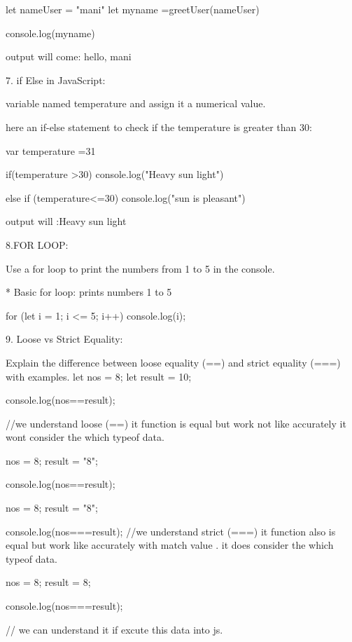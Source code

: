  let nameUser = "mani"
 let myname =greetUser(nameUser)
 
 console.log(myname)

      output will come: hello, mani

7. if Else in JavaScript:

 variable named temperature and assign it a numerical value.

here an if-else statement to check if the temperature is greater than 30:


var temperature =31

if(temperature >30)
{console.log("Heavy sun light")}

else if (temperature<=30)
{console.log("sun is pleasant")}

output will :Heavy sun light



8.FOR LOOP:

Use a for loop to print the numbers from 1 to 5 in the console.


* Basic for loop: prints numbers 1 to 5

for (let i = 1; i <= 5; i++) {
    console.log(i);
  }

 9. Loose vs Strict Equality:

Explain the difference between loose equality (==) and strict equality (===) with examples.
let nos = 8;
let result = 10;

console.log(nos==result);

//we understand loose (==) it function is equal but work not like accurately it wont consider the which typeof data.

 nos = 8;
 result = "8";

console.log(nos==result);


nos = 8;
 result = "8";

console.log(nos===result);
//we understand strict (===) it function also is equal but work like accurately with match value . it does consider the which typeof data.

nos = 8;
 result = 8;

console.log(nos===result);

// we can understand it if excute this data into js.









    

     


          